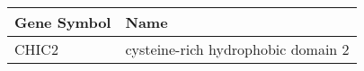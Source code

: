 \begin{tabular}{ll}
\toprule
Gene Symbol &                               Name \\
\midrule
      CHIC2 & cysteine-rich hydrophobic domain 2 \\
\bottomrule
\end{tabular}
